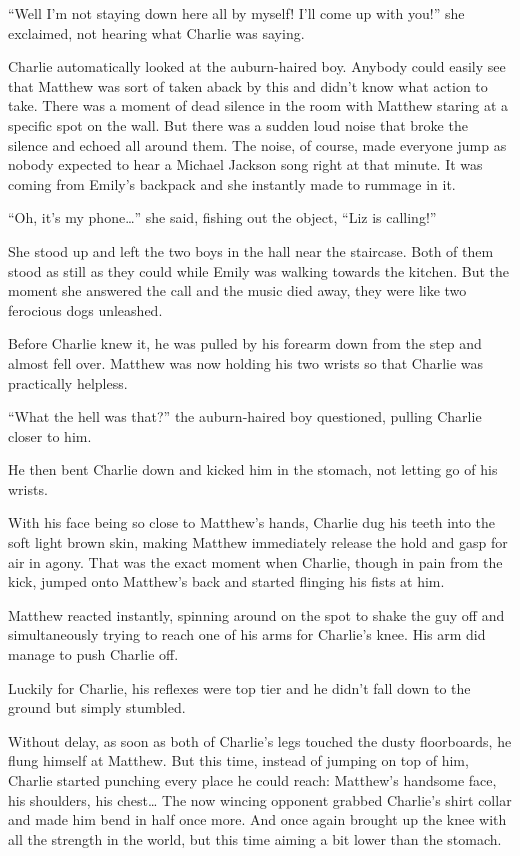 “Well I'm not staying down here all by myself! I'll come up with you!” she exclaimed, not hearing what Charlie was saying.

Charlie automatically looked at the auburn-haired boy. Anybody could easily see that Matthew was sort of taken aback by this and didn't know what action to take. There was a moment of dead silence in the room with Matthew staring at a specific spot on the wall. But there was a sudden loud noise that broke the silence and echoed all around them. The noise, of course, made everyone jump as nobody expected to hear a Michael Jackson song right at that minute. It was coming from Emily's backpack and she instantly made to rummage in it.

“Oh, it's my phone…” she said, fishing out the object, “Liz is calling!”

She stood up and left the two boys in the hall near the staircase. Both of them stood as still as they could while Emily was walking towards the kitchen. But the moment she answered the call and the music died away, they were like two ferocious dogs unleashed.

Before Charlie knew it, he was pulled by his forearm down from the step and almost fell over. Matthew was now holding his two wrists so that Charlie was practically helpless.

“What the hell was that?” the auburn-haired boy questioned, pulling Charlie closer to him.

He then bent Charlie down and kicked him in the stomach, not letting go of his wrists.

With his face being so close to Matthew's hands, Charlie dug his teeth into the soft light brown skin, making Matthew immediately release the hold and gasp for air in agony. That was the exact moment when Charlie, though in pain from the kick, jumped onto Matthew's back and started flinging his fists at him.

Matthew reacted instantly, spinning around on the spot to shake the guy off and simultaneously trying to reach one of his arms for Charlie's knee. His arm did manage to push Charlie off.

Luckily for Charlie, his reflexes were top tier and he didn't fall down to the ground but simply stumbled.

Without delay, as soon as both of Charlie's legs touched the dusty floorboards, he flung himself at Matthew. But this time, instead of jumping on top of him, Charlie started punching every place he could reach: Matthew's handsome face, his shoulders, his chest… The now wincing opponent grabbed Charlie's shirt collar and made him bend in half once more. And once again brought up the knee with all the strength in the world, but this time aiming a bit lower than the stomach.

